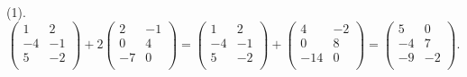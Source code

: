 \documentclass[dvipdfmx,a4paper,11pt]{article}
\theoremstyle{definition}
\begin{document}
\hspace{-11pt}{\Large $\bullet$ 第1問解答例.}

(1).
$$
 \begin{pmatrix}
 1 &2 \\
 -4&-1\\
  5&-2\\
 \end{pmatrix}
 + 2
 \begin{pmatrix}
 2 &-1 \\
  0&4\\
  -7&0\\
 \end{pmatrix}
 =
  \begin{pmatrix}
 1 &2 \\
 -4&-1\\
  5&-2\\
 \end{pmatrix}
 + 
  \begin{pmatrix}
 4 &-2 \\
0&8\\
  -14&0\\
 \end{pmatrix}
 =
  \begin{pmatrix}
5 & 0 \\
-4 & 7 \\
-9 & -2 \\
 \end{pmatrix}.
$$
\end{document}
